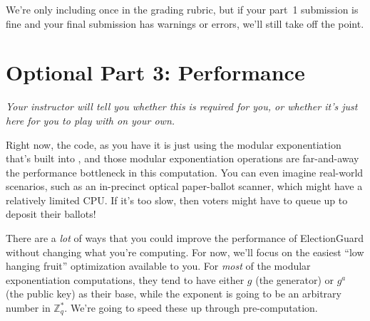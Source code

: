 We're only including  once
in the grading rubric, but if your part~1 submission is fine and your
final submission has warnings or errors, we'll still take off the point.

\section{Optional Part 3: Performance}

{\em Your instructor will tell you whether this is required for you,
or whether it's just here for you to play with on your own.}

Right now, the code, as you have it is just using the modular
exponentiation that's built into , and those modular exponentiation operations
are far-and-away the performance bottleneck in this computation.
You can even imagine real-world scenarios, such as an in-precinct
optical paper-ballot scanner, which might have a relatively limited
CPU. If it's too slow, then voters might have to queue up to deposit
their ballots!

There are a {\em lot} of ways that you could improve the performance
of ElectionGuard without changing what you're computing. For now,
we'll focus on the easiest ``low hanging fruit'' optimization
available to you. For {\em most} of the modular exponentiation
computations, they tend to have either $g$ (the generator) or $g^a$
(the public key) as their base, while the exponent is going to be
an arbitrary number in $\mathbb{Z}_q^*$. We're going to speed these
up through pre-computation.


